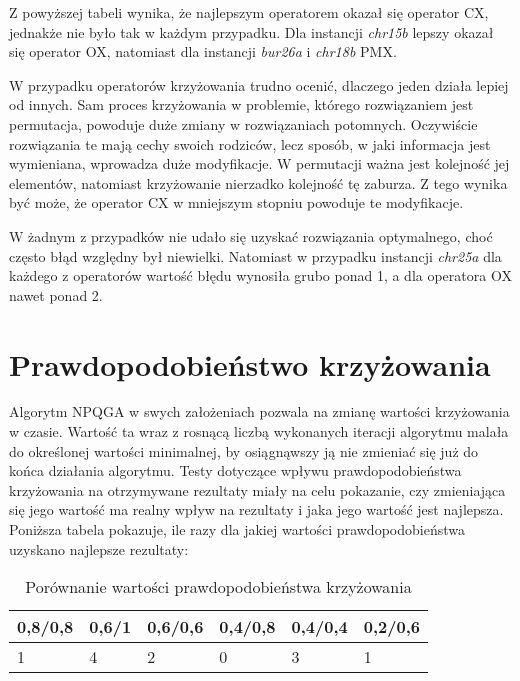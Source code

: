 Z powyższej tabeli wynika, że najlepszym operatorem okazał się operator CX, jednakże nie było tak w każdym przypadku. Dla instancji \textit{chr15b} lepszy okazał się operator OX, natomiast dla instancji \textit{bur26a} i \textit{chr18b} PMX.

W przypadku operatorów krzyżowania trudno ocenić, dlaczego jeden działa lepiej od innych. Sam proces krzyżowania w problemie, którego rozwiązaniem jest permutacja, powoduje duże zmiany w rozwiązaniach potomnych. Oczywiście rozwiązania te mają cechy swoich rodziców, lecz sposób, w jaki informacja jest wymieniana, wprowadza duże modyfikacje. W permutacji ważna jest kolejność jej elementów, natomiast krzyżowanie nierzadko kolejność tę zaburza. Z tego wynika być może, że operator CX w mniejszym stopniu powoduje te modyfikacje.

W żadnym z przypadków nie udało się uzyskać rozwiązania optymalnego, choć często błąd względny był niewielki. Natomiast w przypadku instancji \textit{chr25a} dla każdego z operatorów wartość błędu wynosiła grubo ponad 1, a dla operatora OX nawet ponad 2.

\section{Prawdopodobieństwo krzyżowania}
Algorytm NPQGA w swych założeniach pozwala na zmianę wartości krzyżowania w czasie. Wartość ta wraz z rosnącą liczbą wykonanych iteracji algorytmu malała do określonej wartości minimalnej, by osiągnąwszy ją nie zmieniać się już do końca działania algorytmu. Testy dotyczące wpływu prawdopodobieństwa krzyżowania na otrzymywane rezultaty miały na celu pokazanie, czy zmieniająca się jego wartość ma realny wpływ na rezultaty i jaka jego wartość jest najlepsza. Poniższa tabela pokazuje, ile razy dla jakiej wartości prawdopodobieństwa uzyskano najlepsze rezultaty:

\begin{table}[H]
\label{cross_prob_results}
\begin{center}
\begin{tabular}{l l l l l l}
\hline
0,8/0,8 & 0,6/1 & 0,6/0,6 & 0,4/0,8 & 0,4/0,4 & 0,2/0,6\\
\hline
1 & 4 & 2 & 0 & 3 & 1\\
\hline
\end{tabular}
\end{center}
\caption{Porównanie wartości prawdopodobieństwa krzyżowania}
\end{table}

